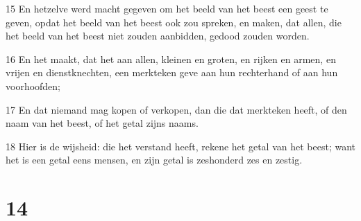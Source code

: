\par 15 En hetzelve werd macht gegeven om het beeld van het beest een geest te geven, opdat het beeld van het beest ook zou spreken, en maken, dat allen, die het beeld van het beest niet zouden aanbidden, gedood zouden worden.
\par 16 En het maakt, dat het aan allen, kleinen en groten, en rijken en armen, en vrijen en dienstknechten, een merkteken geve aan hun rechterhand of aan hun voorhoofden;
\par 17 En dat niemand mag kopen of verkopen, dan die dat merkteken heeft, of den naam van het beest, of het getal zijns naams.
\par 18 Hier is de wijsheid: die het verstand heeft, rekene het getal van het beest; want het is een getal eens mensen, en zijn getal is zeshonderd zes en zestig.

\chapter{14}

